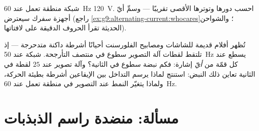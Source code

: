 \begin{exercise}[$\star\star$]\label{exo:g9:alternating-current:11}
شبكة منطقة تعمل عند \qty{60}{Hz}  \qty{120}{V}.
احسب دورها وتوترها الأقصى تقريبًا --- وسمِّ أيّ أجهزة سفرك
سيعترض (راجع \cref{ex:g9:alternating-current:whocares}؛
والشواحن الحديثة تقرأ الحروف الدقيقة على لافتاتها).
\end{exercise}

\begin{exercise}[$\star\star\star$]\label{exo:g9:alternating-current:12}
تُظهر أفلام قديمة للشاشات ومصابيح الفلورسنت أحيانًا أشرطة
داكنة متدحرجة --- إذ تلتقط لقطات آلة التصوير سطوع  في
منتصف التأرجحة.  شبكة عند \qty{50}{Hz} يسطع عند كل قمّة
من \emph{أيّ} إشارة: فكم نبضة سطوع في الثانية؟ وآلة تصوير عند
$25$ لقطة في الثانية تعاين ذلك النبض: استنتج لماذا يرسم
التداخل بين الإيقاعين أشرطة بطيئة الحركة، ولماذا يتغيّر النمط
عند التصوير في منطقة تعمل عند \qty{60}{Hz}.
\end{exercise}

\section{مسألة: منضدة راسم الذبذبات}


